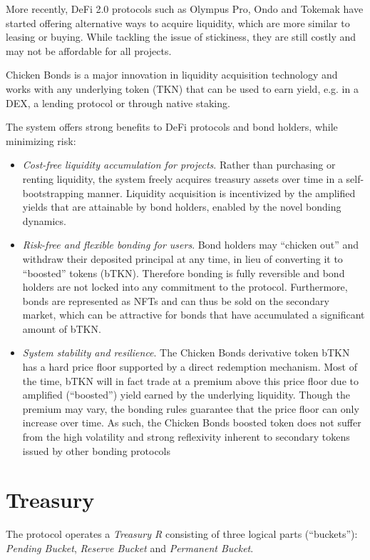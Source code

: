 \documentclass{article}
\begin{document}
More recently, DeFi 2.0 protocols such as Olympus Pro, Ondo and Tokemak have started offering alternative ways to acquire liquidity, which are more similar to leasing or buying. While tackling the issue of stickiness, they are still costly and may not be affordable for all projects.

Chicken Bonds is a major innovation in liquidity acquisition technology and works with any underlying token (TKN) that can be used to earn yield, e.g. in a DEX, a lending protocol or through native staking.

The system offers strong benefits to DeFi protocols and bond holders, while minimizing risk:

\begin{itemize}
    \item \textit{Cost-free liquidity accumulation for projects}. Rather than purchasing or renting liquidity, the system freely acquires treasury assets over time in a self-bootstrapping manner. Liquidity acquisition is incentivized by the amplified yields that are attainable by bond holders, enabled by the novel bonding dynamics.
    \item \textit{Risk-free and flexible bonding for users}. Bond holders may “chicken out” and withdraw their deposited principal at any time, in lieu of converting it to “boosted” tokens (bTKN). Therefore bonding is fully reversible and bond holders are not locked into any commitment to the protocol. Furthermore, bonds are represented as NFTs and can thus be sold on the secondary market, which can be attractive for bonds that have accumulated a significant amount of bTKN.
    \item \textit{System stability and resilience}. The Chicken Bonds derivative token bTKN has a hard price floor supported by a direct redemption mechanism. Most of the time, bTKN will in fact trade at a premium above this price floor due to amplified (“boosted”) yield earned by the underlying liquidity. Though the premium may vary, the bonding rules guarantee that the price floor can only increase over time. As such, the Chicken Bonds boosted token does not suffer from the high volatility and strong reflexivity inherent to secondary tokens issued by other bonding protocols
\end{itemize}

\section{Treasury}
The protocol operates a \textit{Treasury R} consisting of three logical parts (“buckets”):  \textit{Pending Bucket}, \textit{Reserve Bucket} and \textit{Permanent Bucket}.
\end{document}
